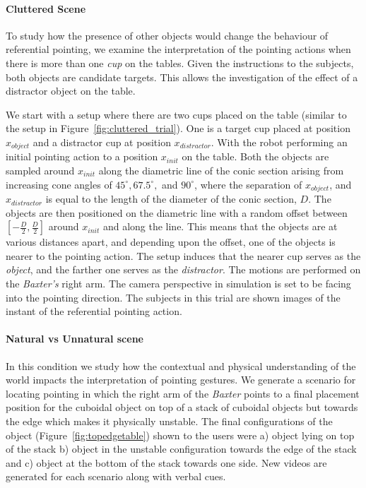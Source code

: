 \paragraph{Cluttered Scene}
To study how the presence of other objects would change the behaviour of referential pointing, we examine the interpretation of the pointing actions when there is more than one \textit{cup} on the tables. Given the instructions to the subjects, both objects are candidate targets. This allows the investigation of the effect of a distractor object on the table.  

We start with a setup where there are two cups placed on the table (similar to the setup in Figure~\ref{fig:cluttered_trial}). One is a target cup placed at position $x_{object}$ and a distractor cup at position $x_{distractor}$. With the robot performing an initial pointing action to a position $x_{init}$ on the table. Both the objects are sampled around $x_{init}$ along the diametric line of the conic section arising from increasing cone angles of $45^\circ, 67.5^\circ, $ and $90^\circ$, where the separation of $x_{object}$, and $x_{distractor}$ is equal to the length of the diameter of the conic section, $D$. The objects are then positioned on the diametric line with a random offset between $[-\frac{D}{2}, \frac{D}{2}]$ around $x_{init}$ and along the line. This means that the objects are at various distances apart, and depending upon the offset, one of the objects is nearer to the pointing action. The setup induces that the nearer cup serves as the \textit{object}, and the farther one serves as the \textit{distractor}. The motions are performed on the \textit{Baxter's} right arm. The camera perspective in simulation is set to be facing into the pointing direction. The subjects in this trial are shown images of the instant of the referential pointing action.




\paragraph{Natural vs Unnatural scene}
In this condition we study how the contextual and physical understanding of the world impacts the interpretation of pointing gestures. We generate a scenario for locating pointing in which the right arm of the \textit{Baxter} points to a final placement position for the cuboidal object on top of a stack of cuboidal objects but towards the edge which makes it physically unstable. The final configurations of the object (Figure~\ref{fig:topedgetable}) shown to the users were a) object lying on top of the stack b) object in the unstable configuration towards the edge of the stack and c) object at the bottom of the stack towards one side. New videos are generated for each scenario along with verbal cues.


